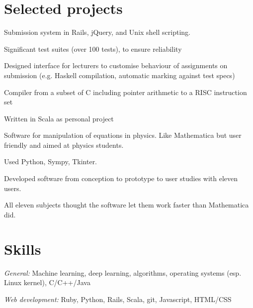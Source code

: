 \documentclass[letterpaper]{resume}
\begin{document}
\section{Selected projects}

\begin{compactitem}
\item Submission system in Rails, jQuery, and Unix shell scripting.
\item Significant test suites (over 100 tests), to ensure reliability
\item Designed interface for lecturers to customise behaviour of assignments on submission (e.g. Haskell compilation, automatic marking against test specs)
\end{compactitem}

\begin{compactitem}
\item Compiler from a subset of C including pointer arithmetic to a RISC instruction set
\item Written in Scala as personal project
\end{compactitem}

\begin{compactitem}
\item Software for manipulation of equations in physics. Like Mathematica but user friendly and aimed at physics students.
\item Used Python, Sympy, Tkinter.
\item Developed software from conception to prototype to user studies with eleven users.
\item All eleven subjects thought the software let them work faster than Mathematica did.
\end{compactitem}


\section{Skills}
\textit{General:} Machine learning, deep learning, algorithms, operating systems (esp. Linux kernel), C/C++/Java

\textit{Web development:} Ruby, Python, Rails, Scala, git, Javascript, HTML/CSS\\
\end{document}
